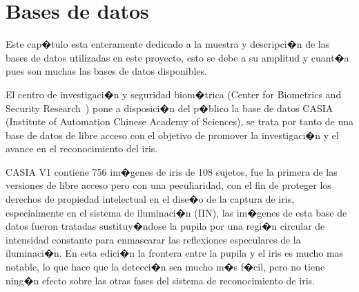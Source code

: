\chapter{Bases de datos}
\label{chap:databases}

Este cap�tulo esta enteramente dedicado a la muestra y descripci�n de las bases de datos utilizadas en este proyecto, esto se debe a su amplitud y cuant�a pues son muchas las bases de datos disponibles.

 \label{sec:CASIA_database}

El centro de investigaci�n y seguridad biom�trica (Center for Biometrics and Security Research~\cite{database:CASIA_web}) pone a disposici�n del p�blico la base de datos CASIA (Institute of Automation Chinese Academy of Sciences), se trata por tanto de una base de datos de libre acceso con el objetivo de promover la investigaci�n y el avance en el reconocimiento del iris.

CASIA V1 contiene 756 im�genes de iris de 108 sujetos, fue la primera de las versiones de libre acceso pero con una peculiaridad, con el fin de proteger los derechos de propiedad intelectual en el dise�o de la captura de iris, especialmente en el sistema de iluminaci�n (IIN), las im�genes de esta base de datos fueron tratadas sustituy�ndose la pupila por una regi�n circular de intensidad constante para enmascarar las reflexiones especulares de la iluminaci�n. En esta edici�n la frontera entre la pupila y el iris es mucho mas notable, lo que hace que la detecci�n sea mucho m�s f�cil, pero no tiene ning�n efecto sobre las otras fases del sistema de reconocimiento de iris.


